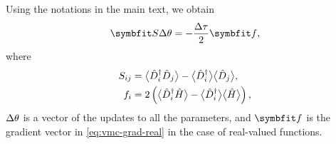 Using the notations in the main text, we obtain
\begin{equation}
\mS \dth = -\frac{\dta}{2} \vf,
\end{equation}
where
\begin{align}
S_{i j} &= \big\langle \hat{D}^\dagger_i \hat{D}_j \big\rangle - \big\langle \hat{D}^\dagger_i \big\rangle \big\langle \hat{D}_j \big\rangle, \\
f_i &= 2 \left( \big\langle \hat{D}^\dagger_i \hat{H} \big\rangle - \big\langle \hat{D}^\dagger_i \big\rangle \big\langle \hat{H} \big\rangle \right),
\end{align}
${\Delta \theta}$ is a vector of the updates to all the parameters, and $\vf$ is the gradient vector in \cref{eq:vmc-grad-real} in the case of real-valued functions.
